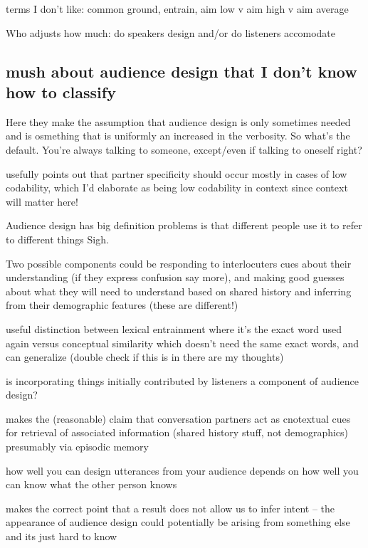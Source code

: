 \documentclass[]{article}
\begin{document}
terms I don't like: common ground, entrain, aim low v aim high v aim average

Who adjusts how much: do speakers design and/or do listeners accomodate




\subsection{mush about audience design that I don't know how to classify}

\cite{horton2002a} Here they make the assumption that audience design is only sometimes needed and is osmething that is uniformly an increased in the verbosity. So what's the default. You're always talking to someone, except/even if talking to oneself right? 

\cite{horton2002a} usefully points out that partner specificity should occur mostly in cases of low codability, which I'd elaborate as being low codability in context since context will matter here!

Audience design has big definition problems is that different people use it to refer to different things Sigh. 

Two possible components could be  responding to interlocuters cues about their understanding (if they express confusion say more), and making good guesses about what they will need to understand based on shared history and inferring from their demographic features (these are different!) 

\cite{horton2002a} useful distinction between lexical entrainment where it's the exact word used again versus conceptual similarity which doesn't need the same exact words, and can generalize (double check if this is in there are my thoughts) 

is incorporating things initially contributed by listeners a component of audience design? 

\cite{horton2005} makes the (reasonable) claim that conversation partners act as cnotextual cues for retrieval of associated information (shared history stuff, not demographics) presumably via episodic memory 

\cite{horton2005} how well you can design utterances from your audience depends on how well you can know what the other person knows

\cite{horton1996} makes the correct point that a result does not allow us to infer intent -- the appearance of audience design could potentially be arising from something else and its just hard to know
\end{document}
